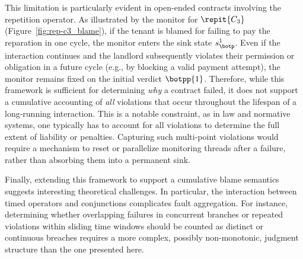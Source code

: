           This limitation is particularly evident in open-ended contracts involving the repetition operator. 
          As illustrated by the monitor for $\repit{C_3}$ (Figure~\ref{fig:rep-c3_blame}), if the tenant is blamed for failing to pay the reparation in one cycle, the monitor enters the sink state $s_{\botp}^1$. 
          Even if the interaction continues and the landlord subsequently violates their permission or obligation in a future cycle (e.g., by blocking a valid payment attempt), the monitor remains fixed on the initial verdict $\botpp{1}$. 
          Therefore, while this framework is sufficient for determining \emph{why} a contract failed, it does not support a cumulative accounting of \emph{all} violations that occur throughout the lifespan of a long-running interaction. 
          This is a notable constraint, as in law and normative systems, one typically has to account for all violations to determine the full extent of liability or penalties.
          Capturing such multi-point violations would require a mechanism to reset or parallelize monitoring threads after a failure, rather than absorbing them into a permanent sink.
          
          Finally, extending this framework to support a cumulative blame semantics suggests interesting theoretical challenges. 
          In particular, the interaction between timed operators and conjunctions complicates fault aggregation. 
          For instance, determining whether overlapping failures in concurrent branches or repeated violations within sliding time windows should be counted as distinct or continuous breaches requires a more complex, possibly non-monotonic, judgment structure than the one presented here.          



